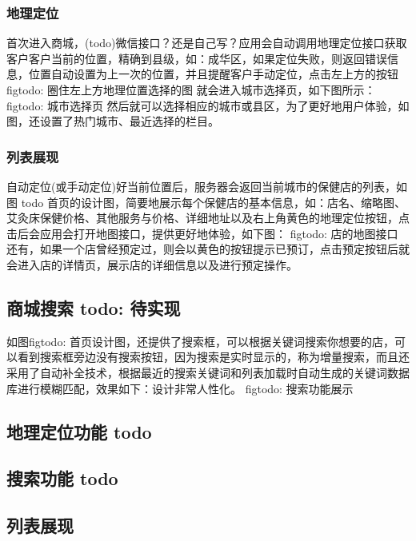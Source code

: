 \documentclass[UTF8]{ctexbook}
\begin{document}
        \subsubsection{地理定位}
          \label{subsubsec:地理定位功能}
            首次进入商城，(todo)微信接口？还是自己写？应用会自动调用地理定位接口获取客户客户当前的位置，精确到县级，如：成华区，如果定位失败，则返回错误信息，位置自动设置为上一次的位置，并且提醒客户手动定位，点击左上方的按钮
            figtodo: 圈住左上方地理位置选择的图
            就会进入城市选择页，如下图所示：
            figtodo: 城市选择页
            然后就可以选择相应的城市或县区，为了更好地用户体验，如图，还设置了热门城市、最近选择的栏目。

        \subsubsection{列表展现}
          \label{subsubsec:列表展现}
            自动定位(或手动定位)好当前位置后，服务器会返回当前城市的保健店的列表，如图 todo 首页的设计图，简要地展示每个保健店的基本信息，如：店名、缩略图、艾灸床保健价格、其他服务与价格、详细地址以及右上角黄色的地理定位按钮，点击后会应用会打开地图接口，提供更好地体验，如下图：
            figtodo: 店的地图接口
            还有，如果一个店曾经预定过，则会以黄色的按钮提示已预订，点击预定按钮后就会进入店的详情页，展示店的详细信息以及进行预定操作。

        \subsection{商城搜索 todo: 待实现}
          \label{subsec:商城搜索_todo_待实现}
            如图figtodo: 首页设计图，还提供了搜索框，可以根据关键词搜索你想要的店，可以看到搜索框旁边没有搜索按钮，因为搜索是实时显示的，称为增量搜索，而且还采用了自动补全技术，根据最近的搜索关键词和列表加载时自动生成的关键词数据库进行模糊匹配，效果如下：设计非常人性化。
            figtodo: 搜索功能展示

    \subsection{地理定位功能 todo}
      \label{subsec:地理定位功能_todo}

    \subsection{搜索功能 todo}
      \label{subsec:搜索功能_todo}

    \subsection{列表展现}
      \label{subsec:列表展现}
\end{document}
